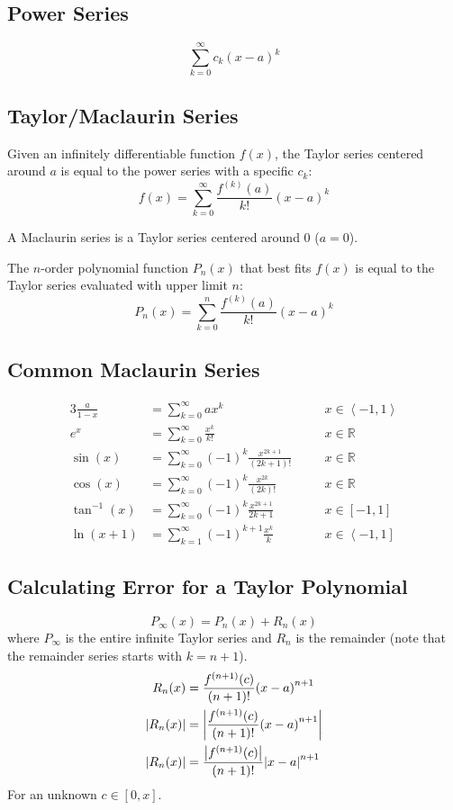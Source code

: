 \documentclass[12pt]{article}
\DeclarePairedDelimiter\abs{\lvert}{\rvert}
\newcommand*{\fixmath}{\makebox{}\vspace{\glueexpr-\baselineskip-\abovedisplayskip}}
\newcommand*{\R}{\mathbb{R}}
\newcommand*{\atan}{\tan^{-1}}
\newcommand*{\isum}[1][k]{\sum_{#1=0}^\infty}
\newenvironment{rmaskip}{\setlength{\abovedisplayskip}{0pt}\fixmath%
  \ignorespaces}{\ignorespacesafterend}
\newenvironment{rmskip}{\setlength{\abovedisplayskip}{0pt}%
  \setlength{\belowdisplayskip}{0pt}\fixmath\ignorespaces}%
  {\ignorespacesafterend}
\begin{document}
\subsection*{Power Series}
\begin{rmskip}
  \[
    \isum c_k{(x-a)}^k
  \]
\end{rmskip}
\subsection*{Taylor\slash Maclaurin Series}
Given an infinitely differentiable function \(f(x)\), the Taylor series
centered around \(a\) is equal to the power series with a specific \(c_k\):
\[
  f(x) = \isum \frac{f^{(k)}(a)}{k!}{(x-a)}^k
\]

A Maclaurin series is a Taylor series centered around 0 (\(a = 0\)).

The \(n\)-order polynomial function \(P_n(x)\) that best fits \(f(x)\) is
equal to the Taylor series evaluated with upper limit \(n\):
\[
  P_n(x) = \sum_{k=0}^{n} \frac{f^{(k)}(a)}{k!}{(x-a)}^k
\]
\subsection*{Common Maclaurin Series}
\begin{rmskip}
  \begin{alignat*}{3}
    \frac{a}{1-x} &= \isum ax^k &&\quad x \in \left<-1,1\right>\\
    e^x &= \isum \frac{x^k}{k!} &&\quad x \in \R\\
    \sin(x) &= \isum {(-1)}^k \frac{x^{2k+1}}{(2k+1)!} &&\quad x \in \R\\
    \cos(x) &= \isum {(-1)}^k \frac{x^{2k}}{(2k)!} &&\quad x \in \R\\
    \atan(x) &= \isum {(-1)}^k \frac{x^{2k+1}}{2k+1} &&\quad x \in [-1,1]\\
    \ln(x+1) &= \sum_{k=1}^\infty {(-1)}^{k+1} \frac{x^k}{k} &&\quad x \in
      \left<-1,1\right]
  \end{alignat*}
\end{rmskip}
\subsection*{Calculating Error for a Taylor Polynomial}
\begin{rmaskip}
  \[
    P_\infty(x) = P_n(x) + R_n(x)
  \]
\end{rmaskip}
where \(P_\infty\) is the entire infinite Taylor series and \(R_n\) is the
remainder (note that the remainder series starts with \(k=n+1\)).
\begin{align*}
  R_n(x) &= \frac{f^{(n+1)}(c)}{(n+1)!}{(x-a)}^{n+1}\\
  \abs*{R_n(x)} &= \abs*{\frac{f^{(n+1)}(c)}{(n+1)!}{(x-a)}^{n+1}}\\
  \abs*{R_n(x)} &= \frac{\abs*{f^{(n+1)}(c)}}{(n+1)!}\abs*{x-a}^{n+1}
\end{align*}
For an unknown \(c \in [0,x]\).
\end{document}
